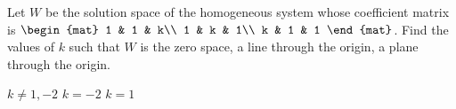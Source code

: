 
\begin{Exercise}[
name={},
title={}, 
difficulty=0,
origin={\cite{BS}}]
Let $W$ be the solution space of the homogeneous system whose coefficient matrix is 
$\begin{mat}
1 & 1 & k\\
1 & k & 1\\
k & 1 & 1
\end{mat}$.
Find the values of $k$ such that $W$ is
\Question the zero space, 
\Question a line through the origin,
\Question a plane through the origin.
\end{Exercise}

\begin{Answer}
\begin{multicols}{3}
\Question $k\neq1, -2$
\Question $k=-2$
\Question $k=1$
\EndCurrentQuestion
\end{multicols}
\end{Answer}
